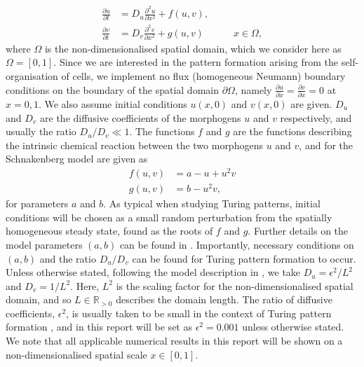 \begin{equation}\label{system}
    \begin{split}
    \frac{\partial u}{\partial t}&=D_u\frac{\partial^2 u}{\partial x^2}+f(u,v),\\
    \frac{\partial v}{\partial t}&=D_v\frac{\partial^2 v}{\partial x^2}+g(u,v) \quad\quad\quad x\in\Omega,
    \end{split}
\end{equation}
where $\Omega$ is the non-dimensionalised spatial domain, which we consider here as $\Omega=[0,1]$. Since we are interested in the pattern formation arising from the self-organisation of cells, we implement no flux (homogeneous Neumann) boundary conditions on the boundary of the spatial domain $\partial\Omega$, namely $\frac{\partial u}{\partial x}=\frac{\partial v}{\partial x}=0$ at $x=0, 1$. We also assume initial conditions $u(x,0)$ and $v(x,0)$ are given. $D_u$ and $D_v$ are the diffusive coefficients of the morphogens $u$ and $v$ respectively, and usually the ratio $D_u/D_v\ll1$.
The functions $f$ and $g$ are the functions describing the intrinsic chemical reaction between the two morphogens $u$ and $v$, and for the Schnakenberg model are given as
\begin{equation}
    \begin{split}
        f(u,v)&=a-u+u^2v\\
        g(u,v)&=b-u^2v,
    \end{split}
\end{equation}
for parameters $a$ and $b$.
As typical when studying Turing patterns, initial conditions will be chosen as a small random perturbation from the spatially homogeneous steady state, found as the roots of $f$ and $g$. Further details on the model parameters $(a,b)$ can be found in \cite{gaffmonk}. Importantly, necessary conditions on $(a,b)$ and the ratio $D_u/D_v$ can be found for Turing pattern formation to occur. Unless otherwise stated, following the model description in \cite{gaffmonk}, we take $D_u=\epsilon^2/L^2$ and $D_v=1/L^2$. Here, $L^2$ is the scaling factor for the non-dimensionalised spatial domain, and so $L\in\mathbb{R}_{>0}$ describes the domain length. The ratio of diffusive coefficients, $\epsilon^2$, is usually taken to be small in the context of Turing pattern formation \cite{murray}, and in this report will be set as $\epsilon^2=0.001$ unless otherwise stated. We note that all applicable numerical results in this report will be shown on a non-dimensionalised spatial scale $x\in[0,1]$.


